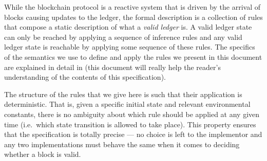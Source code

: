While the blockchain protocol is a reactive system that is driven by the arrival
of blocks causing updates to the ledger, the formal description is a collection
of rules that compose a
static description of what a \textit{valid ledger} is. A valid ledger state can only
be reached by applying a sequence of inference rules and any valid ledger state
is reachable by applying some sequence of these rules.
The specifics of the semantics we use to define and apply
the rules we present in this document are explained in detail in
\cite{small-step-semantics} (this document will really help the reader's
understanding of the contents of this specification).

The structure of the rules that we give here is such that their application is
deterministic. That is, given a specific initial state and relevant environmental
constants, there is no ambiguity
about which rule should be applied at any given time (i.e.~which state
transition is allowed to take place). This property ensures that the specification
is totally precise --- no
choice is left to the implementor and any two implementations must
behave the same when it comes to deciding whether a block is valid.
